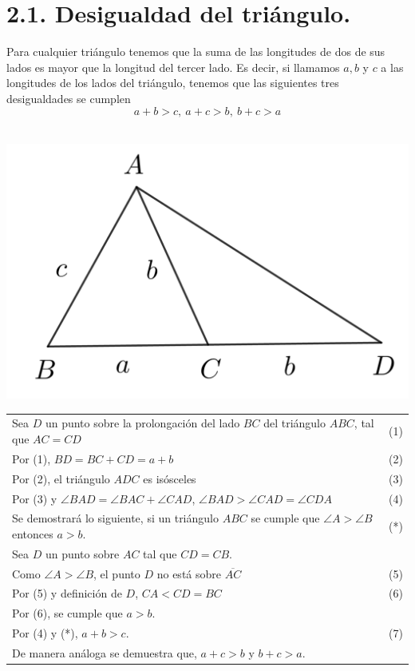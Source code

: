 \documentclass[12pt,a4paper, oneside]{book}
\begin{document}
\section{2.1. Desigualdad del triángulo.}
Para cualquier triángulo tenemos que la suma de las longitudes de dos de sus lados es mayor que la longitud del tercer lado. Es decir, si llamamos $a, b$ y $c$ a las longitudes de los lados del triángulo, tenemos que las siguientes tres desigualdades se cumplen
$$a+b>c, \> a+c>b, \> b+c>a$$
\\
\begin{center}
\includegraphics[scale=0.7]{Imagenes/demo2.png} 
\end{center}
\begin{tabular}{p{15.9cm} p{1cm}}\\
Sea $D$ un punto sobre la prolongación del lado $BC$ del triángulo $ABC$, tal que $AC=CD$ & (1)
\\Por (1), $BD=BC+CD=a+b$ & (2)
\\Por (2), el triángulo $ADC$ es isósceles & (3) 
\\Por (3) y $\angle BAD =\angle BAC +\angle CAD$, $\angle BAD > \angle CAD = \angle CDA$ &(4)
\\Se  demostrará lo siguiente, si un triángulo $ABC$ se cumple que $\angle A > \angle B$ entonces $a > b$. &(*)
\\Sea $D$ un punto sobre $AC$ tal que $CD=CB$.
\\Como $\angle A > \angle B$, el punto $D$ no está sobre $\overline{AC}$ & (5)
\\Por (5) y definición de $D$, $CA<CD=BC$ &(6)
\\Por (6), se cumple que $a>b$.
\\Por (4) y (*), $a+b>c$. &
(7)
\\De manera análoga se demuestra que, $a+c>b$ y $b+c>a$.
\end{tabular}
\end{document}
